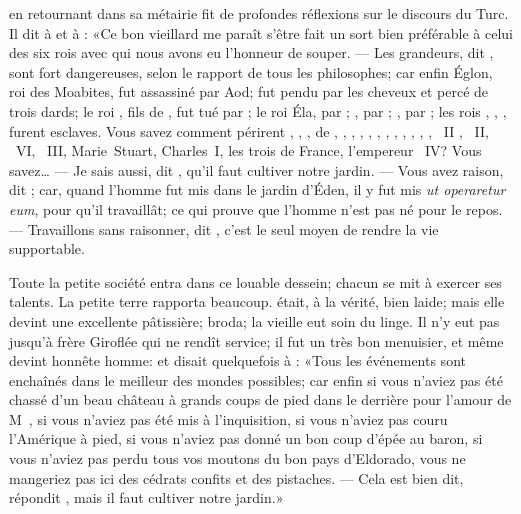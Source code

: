  en retournant dans sa métairie fit de profondes réflexions sur
le discours du Turc. Il dit à  et à : «Ce bon vieillard me
paraît s’être fait un sort bien préférable à celui des six rois avec
qui nous avons eu l’honneur de souper. — Les grandeurs, dit ,
sont fort dangereuses, selon le rapport de tous les philosophes; car
enfin Églon, roi des Moabites, fut assassiné par Aod;  fut pendu
par les cheveux et percé de trois dards; le roi , fils de
, fut tué par ; le roi Éla, par ; , par
; , par ; les rois , , ,
furent esclaves. Vous savez comment périrent , , ,
 de , , , , , ,
, , , , , , ~II
, ~II, ~VI, ~III, \mbox{Marie Stuart}, Charles~I, les trois  de France, l’empereur ~IV? Vous savez… — Je
sais aussi, dit , qu’il faut cultiver notre jardin. — Vous avez
raison, dit ; car, quand l’homme fut mis dans le jardin d’Éden,
il y fut mis \emph{ut operaretur eum}, pour qu’il travaillât; ce qui prouve
que l’homme n’est pas né pour le repos. — Travaillons sans raisonner, dit
, c’est le seul moyen de rendre la vie supportable.

Toute la petite société entra dans ce louable dessein; chacun se mit à
exercer ses talents. La petite terre rapporta beaucoup. 
était, à la vérité, bien laide; mais elle devint une excellente
pâtissière;  broda; la vieille eut soin du linge. Il n’y eut
pas jusqu’à frère Giroflée qui ne rendît service; il fut un très bon
menuisier, et même devint honnête homme: et  disait quelquefois
à : «Tous les événements sont enchaînés dans le meilleur des
mondes possibles; car enfin si vous n’aviez pas été chassé d’un beau
château à grands coups de pied dans le derrière pour l’amour de
M~, si vous n’aviez pas été mis à l’inquisition, si
vous n’aviez pas couru l’Amérique à pied, si vous n’aviez pas donné un
bon coup d’épée au baron, si vous n’aviez pas perdu tous vos moutons du
bon pays d’Eldorado, vous ne mangeriez pas ici des cédrats confits et
des pistaches. — Cela est bien dit, répondit , mais il faut
cultiver notre jardin.»


\endinput



